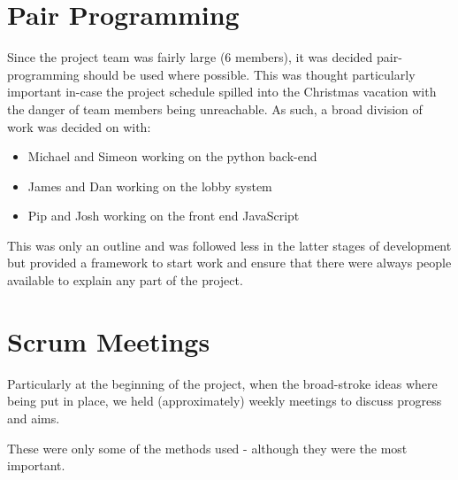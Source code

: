 \section{Pair Programming}
Since the project team was fairly large (6 members), it was decided pair-programming should be used where possible. This was thought particularly important in-case the project schedule spilled into the Christmas vacation with the danger of team members being unreachable.
As such, a broad division of work was decided on with:
\vspace{-3mm}
\begin{itemize}
  \item Michael and Simeon working on the python back-end
  \vspace{-3mm}
  \item James and Dan working on the lobby system
  \vspace{-3mm}
  \item Pip and Josh working on the front end JavaScript
\end{itemize}

This was only an outline and was followed less in the latter stages of development but provided a framework to start work and ensure that there were always people available to explain any part of the project.

\section{Scrum Meetings}
Particularly at the beginning of the project, when the broad-stroke ideas where being put in place, we held (approximately) weekly meetings to discuss progress and aims.

\begin{flushright}
These were only some of the methods used - although they were the most important.
\end{flushright}